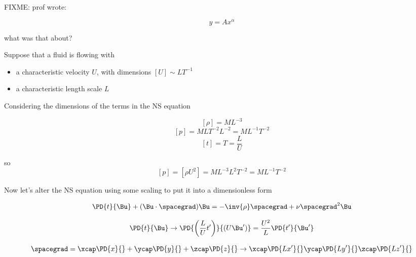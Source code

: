 FIXME: prof wrote:

\begin{equation}\label{eqn:continuumL14:210}
y = A x^\alpha
\end{equation}

what was that about?

Suppose that a fluid is flowing with

\begin{itemize}
\item a characteristic velocity $U$, with dimensions $[U] \sim L T^{-1}$
\item a characteristic length scale $L$
\end{itemize}

Considering the dimensions of the terms in the NS equation

\begin{equation}\label{eqn:continuumL14:230}
[\rho] = M L^{-3}
\end{equation}
\begin{equation}\label{eqn:continuumL14:250}
[p] = M L T^{-2} L^{-2} = M L^{-1} T^{-2}
\end{equation}
\begin{equation}\label{eqn:continuumL14:270}
[t] = T = \frac{L}{U}
\end{equation}

so 
\begin{equation}\label{eqn:continuumL14:290}
[p] = [\rho U^2] = M L^{-3} L^2 T^{-2}  = M L^{-1} T^{-2}
\end{equation}

Now let's alter the NS equation using some scaling to put it into a dimensionless form

\begin{equation}\label{eqn:continuumL14:310}
\PD{t}{\Bu} + (\Bu \cdot \spacegrad) \Bu = - \inv{\rho} \spacegrad + \nu \spacegrad^2 \Bu
\end{equation}

\begin{equation}\label{eqn:continuumL14:330}
\PD{t}{\Bu} \rightarrow  \PD{\left(\frac{L}{U} t'\right)}{(U \Bu')} = \frac{U^2}{L} \PD{t'}{\Bu'}
\end{equation}

\begin{equation}\label{eqn:continuumL14:350}
\spacegrad = 
\xcap \PD{x}{}
+\ycap \PD{y}{}
+\zcap \PD{z}{}
\rightarrow 
\xcap \PD{L x'}{}
\ycap \PD{L y'}{}
\zcap \PD{L z'}{}
\end{equation}

